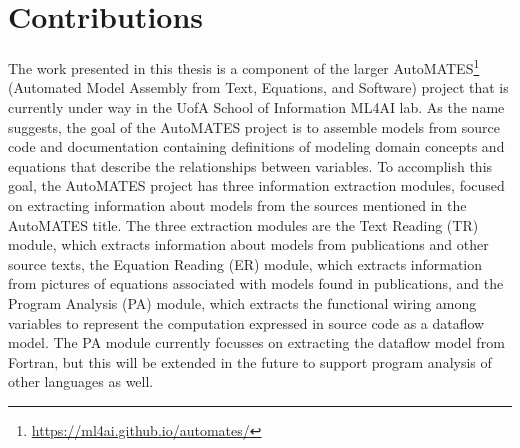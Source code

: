 

\section{Contributions\label{sec:contributions}}
The work presented in this thesis is a component of the larger AutoMATES\footnote{\url{https://ml4ai.github.io/automates/}} (Automated Model Assembly from Text, Equations, and Software) project \citep{pyarelal2019} that is currently under way in the UofA School of Information ML4AI lab.
As the name suggests, the goal of the AutoMATES project is to assemble models from source code and documentation containing definitions of modeling domain concepts and equations that describe the relationships between variables.
To accomplish this goal, the AutoMATES project has three information extraction modules, focused on extracting information about models from the sources mentioned in the AutoMATES title.
The three extraction modules are the Text Reading (TR) module, which extracts information about models from publications and other source texts, the Equation Reading (ER) module, which extracts information from pictures of equations associated with models found in publications, and the Program Analysis (PA) module, which extracts the functional wiring among variables to represent the computation expressed in source code as a dataflow model. The PA module currently focusses on extracting the dataflow model from Fortran, but this will be extended in the future to support program analysis of other languages as well.

